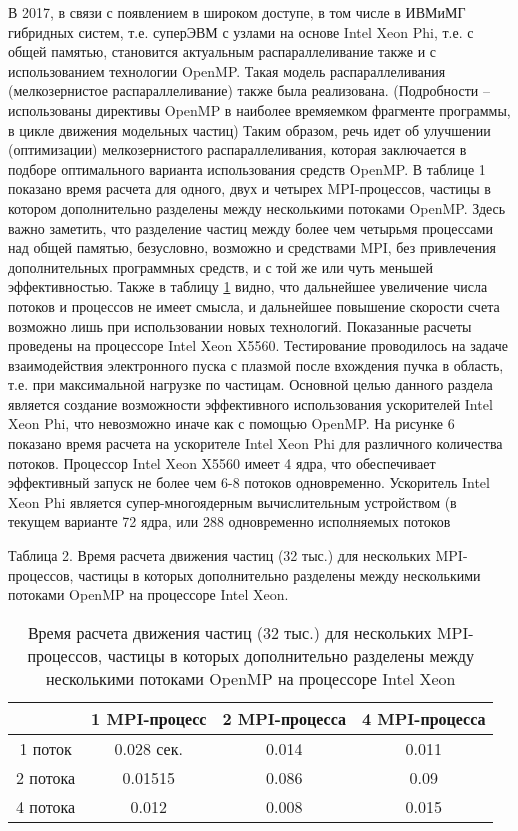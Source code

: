 В 2017, в связи с появлением в широком доступе, в том числе в ИВМиМГ гибридных систем, т.е. суперЭВМ с узлами на основе Intel Xeon Phi, т.е. с общей памятью, становится актуальным распараллеливание также и с использованием технологии OpenMP. Такая модель распараллеливания (мелкозернистое распараллеливание) также была реализована. (Подробности – использованы директивы OpenMP в наиболее времяемком фрагменте программы, в цикле движения модельных частиц) Таким образом, речь идет об улучшении (оптимизации) мелкозернистого распараллеливания, которая заключается в подборе оптимального варианта использования средств OpenMP. 
В таблице 1 показано время расчета для одного, двух и четырех MPI-процессов, частицы в котором дополнительно разделены между несколькими потоками OpenMP. Здесь важно заметить, что разделение частиц между более чем четырьмя процессами над общей памятью, безусловно, возможно и средствами MPI, без привлечения дополнительных программных средств, и с той же или чуть меньшей эффективностью. Также в таблицу \ref{tabXeon} видно, что дальнейшее увеличение числа потоков и процессов не имеет смысла, и дальнейшее повышение скорости счета возможно лишь при использовании новых технологий. Показанные расчеты проведены на процессоре Intel Xeon X5560. Тестирование проводилось на задаче взаимодействия электронного пуска с плазмой после вхождения пучка в область, т.е. при максимальной нагрузке по частицам.
Основной целью данного раздела является создание возможности эффективного использования ускорителей Intel Xeon Phi, что невозможно иначе как с помощью OpenMP. На рисунке 6 показано время расчета на ускорителе Intel Xeon Phi  для различного количества потоков. Процессор Intel Xeon X5560 имеет 4 ядра, что обеспечивает эффективный запуск не более чем 6-8 потоков одновременно. Ускоритель Intel Xeon Phi является супер-многоядерным вычислительным устройством (в текущем варианте 72 ядра, или 288 одновременно исполняемых потоков

Таблица 2. Время расчета движения частиц (32 тыс.) для нескольких MPI-процессов, частицы в которых дополнительно разделены между несколькими потоками OpenMP на процессоре Intel Xeon.

\begin{table} [htbp]
	\centering
	\changecaptionwidth\captionwidth{15cm}
	\caption{Время расчета движения частиц (32 тыс.) для нескольких MPI-процессов, частицы в которых дополнительно разделены между несколькими потоками OpenMP на процессоре Intel Xeon}
	\label{tabXeon}%
	\begin{tabular}{| c | c | c| c|}
		\hline
          &  1 MPI-процесс & 2 MPI-процесса & 4 MPI-процесса \\ \hline
1 поток   & 0.028 сек.     & 0.014          & 0.011          \\ \hline
2 потока  & 0.01515        & 0.086          & 0.09           \\ \hline
4 потока  & 0.012          & 0.008          & 0.015          \\ \hline
	\end{tabular}
\end{table}

